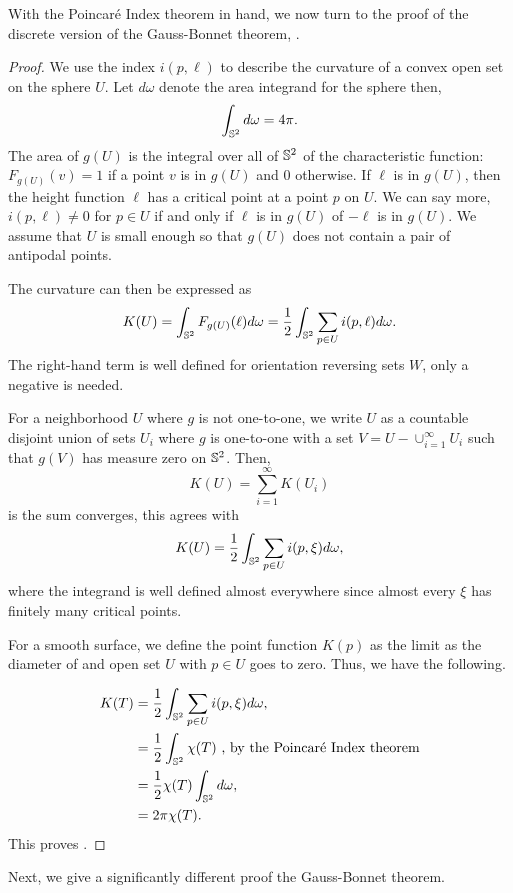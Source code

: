 With the Poincar\'e Index theorem in hand, we now turn to the proof of
the discrete version of the Gauss-Bonnet theorem, .
\begin{proof}


We use the index $i(p,\ell)$ to describe the curvature of a convex open
set on the sphere $U$. Let $d\omega$ denote the area integrand for the sphere
then,
$$\int_{\mathbb{S}^2} d\omega =4\pi.$$
The area of $g(U)$ is the integral over all of $\mathbb{S}^2$ of the characteristic function:
$F_{g(U)}(v)=1$ if a point $v$ is in $g(U)$ and $0$ otherwise.
If $\ell$ is in $g(U)$, then the height function $\ell$ has a critical point at
a point $p$ on $U$. We can say more, $i(p,\ell)\neq 0$ for $p\in U$ if and only if
$\ell$ is in $g(U)$ of $-\ell$ is in $g(U)$. We assume that $U$ is small enough so that
$g(U)$ does not contain a pair of antipodal points.

The curvature can then be expressed as 
$$K(U)=\int_{\mathbb{S}^2}F_{g(U)}(\ell)d\omega =\frac{1}{2}\int_{\mathbb{S}^2}\sum_{p\in U} i(p,\ell)d\omega.$$
The right-hand term is well defined for orientation reversing sets $W$, only a negative is needed.

For a neighborhood $U$ where $g$ is not one-to-one, we write $U$ as a countable
disjoint union of sets $U_i$ where $g$ is one-to-one with a set $V=U-\cup_{i=1}^\infty U_i$
such that $g(V)$ has measure zero on $\mathbb{S}^2$. Then,
$$K(U)=\sum_{i=1}^\infty K(U_i)$$ is the sum converges, this agrees with 
$$K(U)=\frac{1}{2}\int_{\mathbb{S}^2}\sum_{p\in U} i(p,\xi)d\omega,$$
where the integrand is well defined almost everywhere since almost every $\xi$
has finitely many critical points.

For a smooth surface, we define the point function $K(p)$ as the limit as the diameter of 
and open set $U$ with $p\in U$ goes to zero. Thus, we have the following.

\begin{align}
K(T) &=\frac{1}{2}\int_{\mathbb{S}^2}\sum_{p\in U} i(p,\xi)d\omega,  \\ \nonumber
       &=\frac{1}{2}\int_{\mathbb{S}^2}\chi(T) \text{ , by the Poincar\'e Index theorem}\\ \nonumber
       &=\frac{1}{2}\chi(T)\int_{\mathbb{S}^2}d\omega, \\ \nonumber
       &=2\pi\chi(T). \nonumber 
\end{align}
This proves .

\end{proof}
Next, we give a significantly different proof the Gauss-Bonnet theorem. 


